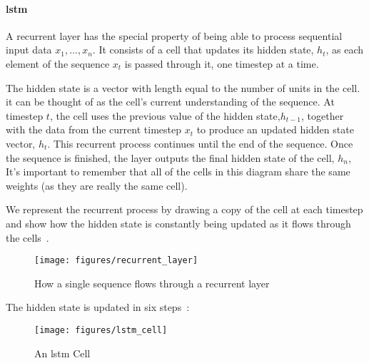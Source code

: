 \paragraph{\gls{lstm}}


A recurrent layer has the special property of being able to process sequential input data \(x_{1}, \ldots , x_{n} \).
It consists of a cell that updates its hidden state, \( h_{t}\), as each element of the sequence \( x_{t} \) is passed through it, one timestep at a time.

The hidden state is a vector with length equal to the number of units in the cell.
it can be thought of as the cell’s current understanding of the sequence.
At timestep \( t \), the cell uses the previous value of the hidden state,\( h_{t-1} \), together with the data from the current timestep \( x_{t} \) to produce an updated hidden state vector, \( h_t\).
This recurrent process continues until the end of the sequence.
Once the sequence is finished, the layer outputs the final hidden state of the cell, \( h_n \),
It’s important to remember that all of the cells in this diagram share the same weights (as they are really the same cell).

We represent the recurrent process by drawing a copy of the cell at each timestep and show how the hidden state is constantly being updated as it flows through the cells~.

\begin{figure}
	\begin{center}
		\texttt{[image: figures/recurrent\_layer]}
	\end{center}
	\caption{How a single sequence flows through a recurrent layer}\label{fig:recurrent_layer}
\end{figure}


The hidden state is updated in six steps~:

\begin{figure}
	\begin{center}
		\texttt{[image: figures/lstm\_cell]}
	\end{center}
	\caption{An \gls{lstm} Cell}\label{fig:lstm_cell}
\end{figure}



